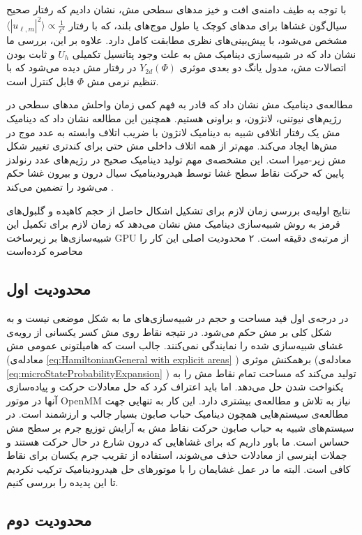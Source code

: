 با توجه به طیف دامنه‌ی افت و خیز مد‌های سطحی مش، نشان دادیم که رفتار صحیح سیال‌گون غشا‌ها برای مد‌های کوچک یا طول موج‌های بلند، که با رفتار 
 $\langle|u_{\ell,m}|^2\rangle\propto \frac{1}{\ell^4}$
مشخص می‌شود، با پیش‌بینی‌های نظری مطابقت کامل دارد. علاوه بر این، بررسی ما نشان داد که در شبیه‌سازی دینامیک مش به علت وجود پتانسیل تکمیلی
$U_h$
و ثابت بودن اتصالات مش، مدول یانگ دو بعدی موثری 
$Y_{2d}(\Phi)$
در رفتار مش دیده‌ می‌شود که با تنظیم نرمی مش
 $\Phi$ 
قابل کنترل است.

مطالعه‌ی دینامیک مش نشان داد که قادر به فهم کمی زمان واحلش مد‌های سطحی در رژیم‌های نیوتنی، لانژون، و براونی هستیم. همچنین این مطالعه نشان داد که دینامیک مش یک رفتار اتلافی شبیه‌ به دینامیک لانژون با ضریب اتلاف وابسته به عدد موج در مش‌ها ایجاد می‌کند. مهم‌تر از همه اتلاف داخلی مش حتی برای کند‌تری تغییر شکل مش زیر-میرا است. این مشخصه‌ی مهم تولید دینامیک صحیح در رژیم‌های عدد رنولدز پایین که حرکت نقاط سطح غشا توسط هیدرودینامیک سیال درون و بیرون غشا حکم می‌شود را تضمین می‌کند
\cite{schneider1984,milnersafranPRA1987}
.

نتایج اولیه‌ی بررسی زمان لازم برای تشکیل اشکال حاصل از حجم کاهیده و گلبول‌های قرمز به روش شبیه‌سازی دینامیک مش نشان می‌دهد که زمان لازم برای تکمیل این شبیه‌سازی‌ها بر زیرساخت 
GPU
از مرتبه‌ی دقیقه است. ۲ محدودیت اصلی این کار را محاصره کرده‌است
\subsection{
محدودیت اول
}

در درجه‌ی اول قید مساحت و حجم در شبیه‌سازی‌های ما به شکل موضعی
\cite{Vutukuri2020}
نیست و به شکل کلی بر مش حکم می‌شود. در نتیجه نقاط روی مش کسر یکسانی از رویه‌ی غشای شبیه‌سازی شده را نمایندگی نمی‌کنند. جالب است که هامیلتونی عمومی مش (معادله‌ی
\ref{eq:HamiltonianGeneral with explicit areas}
)  برهمکنش موثری (معادله‌ی
\ref{eq:microStateProbabilityExpansion}
) تولید می‌کند که مساحت تمام نقاط مش را به یکنواخت شدن حل می‌دهد.  اما باید اعتراف کرد که حل معادلات حرکت و پیاده‌سازی آنها در موتور 
OpenMM
نیاز به تلاش و مطالعه‌ی بیشتری دارد. این کار به تنهایی  جهت مطالعه‌ی سیستم‌هایی همچون دینامیک حباب صابون بسیار جالب و ارزشمند است.  در سیستم‌های شبیه‌ به حباب صابون حرکت نقاط مش به آرایش توزیع جرم بر سطح مش حساس است. ما باور داریم که برای غشا‌هایی که درون شارع در حال حرکت هستند و جملات اینرسی از معادلات حذف می‌شوند، استفاده از تقریب جرم یکسان برای نقاط کافی است. البته ما در عمل غشایمان را با موتورهای حل هیدرودینامیک
\cite{MPCD2008JCP}
 ترکیب نکردیم تا این پدیده را بررسی کنیم.

\subsection{
محدودیت دوم
}


